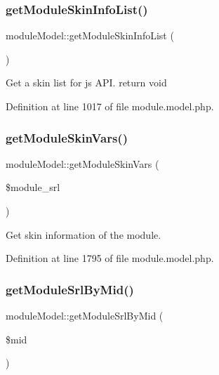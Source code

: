 \hypertarget{classmoduleModel_a9fae8e7a41eda8e384cb46d25430ae82}{}\label{classmoduleModel_a9fae8e7a41eda8e384cb46d25430ae82} 
\subsubsection{\texorpdfstring{get\+Module\+Skin\+Info\+List()}{getModuleSkinInfoList()}}
{\footnotesize\ttfamily module\+Model\+::get\+Module\+Skin\+Info\+List (\begin{DoxyParamCaption}{ }\end{DoxyParamCaption})}

Get a skin list for js A\+PI. return void 

Definition at line 1017 of file module.\+model.\+php.

\hypertarget{classmoduleModel_aa3828c94af2b1c8b84fafd423038445d}{}\label{classmoduleModel_aa3828c94af2b1c8b84fafd423038445d} 
\subsubsection{\texorpdfstring{get\+Module\+Skin\+Vars()}{getModuleSkinVars()}}
{\footnotesize\ttfamily module\+Model\+::get\+Module\+Skin\+Vars (\begin{DoxyParamCaption}\item[{}]{\$module\+\_\+srl }\end{DoxyParamCaption})}



Get skin information of the module. 



Definition at line 1795 of file module.\+model.\+php.

\hypertarget{classmoduleModel_a857a241844d60b7678bd144175d23f29}{}\label{classmoduleModel_a857a241844d60b7678bd144175d23f29} 
\subsubsection{\texorpdfstring{get\+Module\+Srl\+By\+Mid()}{getModuleSrlByMid()}}
{\footnotesize\ttfamily module\+Model\+::get\+Module\+Srl\+By\+Mid (\begin{DoxyParamCaption}\item[{}]{\$mid }\end{DoxyParamCaption})}



